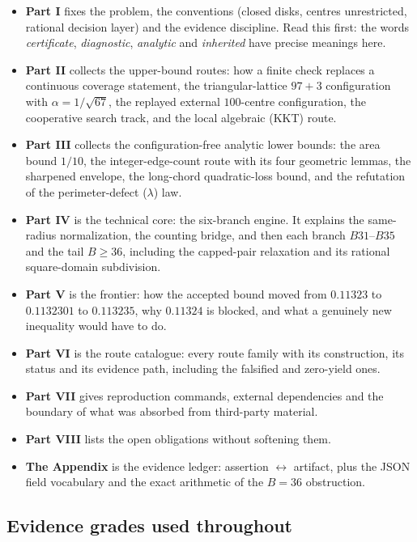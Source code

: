 \begin{itemize}[leftmargin=1.4em,itemsep=2pt]
\item \textbf{Part I} fixes the problem, the conventions (closed disks, centres unrestricted,
rational decision layer) and the evidence discipline. Read this first: the words
\emph{certificate}, \emph{diagnostic}, \emph{analytic} and \emph{inherited} have precise meanings
here.
\item \textbf{Part II} collects the upper-bound routes: how a finite check replaces a continuous
coverage statement, the triangular-lattice $97{+}3$ configuration with $\alpha=1/\sqrt{67}$, the
replayed external $100$-centre configuration, the cooperative search track, and the local
algebraic (KKT) route.
\item \textbf{Part III} collects the configuration-free analytic lower bounds: the area bound
$1/10$, the integer-edge-count route with its four geometric lemmas, the sharpened envelope, the
long-chord quadratic-loss bound, and the refutation of the perimeter-defect ($\lambda$) law.
\item \textbf{Part IV} is the technical core: the six-branch engine. It explains the same-radius
normalization, the counting bridge, and then each branch $B31$--$B35$ and the tail $B\ge36$,
including the capped-pair relaxation and its rational square-domain subdivision.
\item \textbf{Part V} is the frontier: how the accepted bound moved from $0.11323$ to $0.1132301$
to $0.113235$, why $0.11324$ is blocked, and what a genuinely new inequality would have to do.
\item \textbf{Part VI} is the route catalogue: every route family with its construction, its
status and its evidence path, including the falsified and zero-yield ones.
\item \textbf{Part VII} gives reproduction commands, external dependencies and the boundary of
what was absorbed from third-party material.
\item \textbf{Part VIII} lists the open obligations without softening them.
\item \textbf{The Appendix} is the evidence ledger: assertion $\leftrightarrow$ artifact, plus the
JSON field vocabulary and the exact arithmetic of the $B=36$ obstruction.
\end{itemize}

\subsection*{Evidence grades used throughout}

